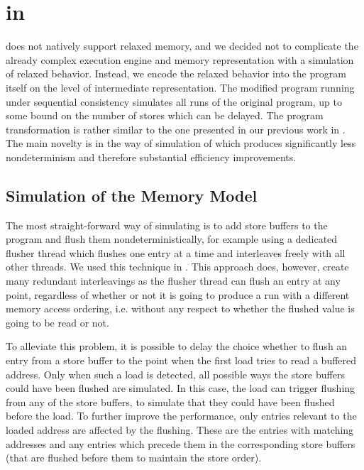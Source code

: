 \section{\xtso in \divine}\label{sec:work}


\divine does not natively support relaxed memory, and we decided not to complicate the already complex execution engine and memory representation with a simulation of relaxed behavior.
Instead, we encode the relaxed behavior into the program itself on the level of \llvm intermediate representation.
The modified program running under sequential consistency simulates all \xtso runs of the original program, up to some bound on the number of stores which can be delayed.
The program transformation is rather similar to the one presented in our previous work in .
The main novelty is in the way of simulation of \xtso which produces significantly less nondeterminism and therefore substantial efficiency improvements.

\subsection{Simulation of the \xtso Memory Model}

The most straight-forward way of simulating \xtso is to add store buffers to the program and flush them nondeterministically, for example using a dedicated flusher thread which flushes one entry at a time and interleaves freely with all other threads.
We used this technique in .
This approach does, however, create many redundant interleavings as the flusher
thread can flush an entry at any point, regardless of whether or not it is going
to produce a run with a different memory access ordering, i.e. without any
respect to whether the flushed value is going to be read or not.

To alleviate this problem, it is possible to delay the choice whether to flush
an entry from a store buffer to the point when the first load tries to read a buffered address.
Only when such a load is detected, all possible ways the store buffers could have been flushed are simulated.
In this case, the load can trigger flushing from any of the store buffers, to simulate that they could have been flushed before the load.
To further improve the performance, only entries relevant to the loaded address
are affected by the flushing.
These are the entries with matching addresses and any entries which precede them in the corresponding store buffers (that are flushed before them to maintain the store order).

